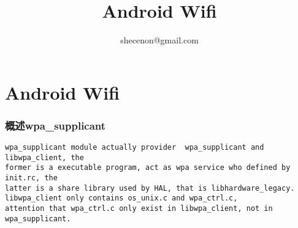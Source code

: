\documentclass[a4paper,11pt,]{article}%
\title{Android Wifi}
\author{shecenon@gmail.com}
\begin{document}
\ttfamily
\maketitle
\tableofcontents
\printindex
\newpage
\renewcommand{\refname}{参考文献}
\renewcommand\contentsname{目录}
\renewcommand\listfigurename{插图目录}
\renewcommand\listtablename{表格目录}
\renewcommand\indexname{索引}
\renewcommand\appendixname{附录}
\renewcommand\figurename{图}
\renewcommand\tablename{表}
\renewcommand{\lstlistlistingname}{代码列表集}
\renewcommand{\lstlistingname}{代码}

\def\equationautorefname{公式}%
\def\figureautorefname{图}%
\def\subfigureautorefname{子图}%
\def\sectionautorefname{节}%
\def\subsectionautorefname{子节}%
\def\subsubsectionautorefname{小节}%
\def\Itemautorefname{项}%
\def\tableautorefname{表格}%
\def\footnoteautorefname{脚注} 
\def\appendixautorefname{附录}
\newcommand{\invoke}[1]{\\ -\textgreater\hspace{#1}}
\newcommand{\methodnode}[3]{\rnode{#3}{\psframebox{#1#2\ref{#1}~#3}}\vspace{20pt}\newline }
\newcommand{\methodcall}[2]{\ncarc{->}{#1}{#2}\ncput*{call}}
\small
\part{Android Wifi}
\section{概述wpa_supplicant}
\begin{verbatim}
wpa_supplicant module actually provider  wpa_supplicant and libwpa_client, the
former is a executable program, act as wpa service who defined by init.rc, the
latter is a share library used by HAL, that is libhardware_legacy.
libwpa_client only contains os_unix.c and wpa_ctrl.c,
attention that wpa_ctrl.c only exist in libwpa_client, not in wpa_supplicant.
\end{verbatim}
\end{document}
